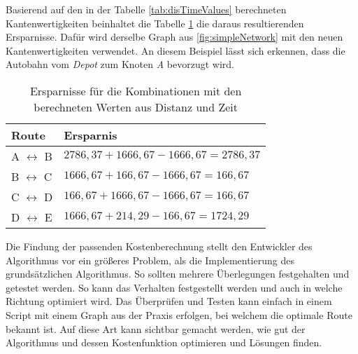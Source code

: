 \noindent
Basierend auf den in der Tabelle \ref{tab:disTimeValues} berechneten Kantenwertigkeiten beinhaltet die Tabelle \ref{tab:savingsDZ} die daraus resultierenden Ersparnisse. 
Dafür wird derselbe Graph aus \ref{fig:simpleNetwork} mit den neuen Kantenwertigkeiten verwendet. 
An diesem Beispiel lässt sich erkennen, dass die Autobahn vom \textit{Depot} zum Knoten \textit{A} bevorzugt wird. 
\begin{table}[htb]%
\centering%
\begin{tabular}{p{3cm}|p{7cm}}
Route & Ersparnis \\ 
\hline 
A $\leftrightarrow$ B & $2786,37 + 1666,67 - 1666,67 = 2786,37$ \\ 
B $\leftrightarrow$ C & $1666,67 + 166,67 - 1666,67 = 166,67$ \\ 
C $\leftrightarrow$ D & $166,67 + 1666,67 - 1666,67 = 166,67$ \\ 
D $\leftrightarrow$ E & $1666,67 + 214,29 - 166,67 = 1724,29$ \\ 
\end{tabular} 
\caption{Ersparnisse für die Kombinationen mit den berechneten Werten aus Distanz und Zeit}
\label{tab:savingsDZ}
\end{table}

\noindent
Die Findung der passenden Kostenberechnung stellt den Entwickler des Algorithmus vor ein größeres Problem, als die Implementierung des grundsätzlichen Algorithmus. 
So sollten mehrere Überlegungen festgehalten und getestet werden. 
So kann das Verhalten festgestellt werden und auch in welche Richtung optimiert wird. 
Das Überprüfen und Testen kann einfach in einem Script mit einem Graph aus der Praxis erfolgen, bei welchem die optimale Route bekannt ist. 
Auf diese Art kann sichtbar gemacht werden, wie gut der Algorithmus und dessen Kostenfunktion optimieren und Lösungen finden. 




